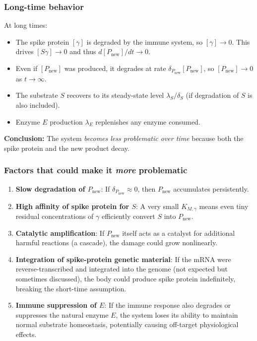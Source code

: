 \documentclass[12pt]{article}
\newcommand{\KMg}{K_{M,\gamma}}
\begin{document}
\subsubsection*{Long-time behavior}

At long times:
\begin{itemize}
  \item The spike protein $[\gamma]$ is degraded by the immune system, so $[\gamma] \to 0$.
        This drives $[S\gamma] \to 0$ and thus $d[P_{\text{new}}]/dt \to 0$.
  \item Even if $[P_{\text{new}}]$ was produced, it degrades at rate $\delta_{P_{\text{new}}}[P_{\text{new}}]$,
        so $[P_{\text{new}}] \to 0$ as $t \to \infty$.
  \item The substrate $S$ recovers to its steady-state level $\lambda_S / \delta_S$ (if
        degradation of $S$ is also included).
  \item Enzyme $E$ production $\lambda_E$ replenishes any enzyme consumed.
\end{itemize}
\textbf{Conclusion:} The system \emph{becomes less problematic over time} because both the spike
protein and the new product decay.

\subsubsection*{Factors that could make it \emph{more} problematic}

\begin{enumerate}[label=\arabic*.]
  \item \textbf{Slow degradation of $P_{\text{new}}$}: If $\delta_{P_{\text{new}}} \approx 0$, then
        $P_{\text{new}}$ accumulates persistently.
  \item \textbf{High affinity of spike protein for $S$}: A very small $\KMg$ means even tiny
        residual concentrations of $\gamma$ efficiently convert $S$ into $P_{\text{new}}$.
  \item \textbf{Catalytic amplification}: If $P_{\text{new}}$ itself acts as a catalyst for
        additional harmful reactions (a cascade), the damage could grow nonlinearly.
  \item \textbf{Integration of spike-protein genetic material}: If the mRNA were reverse-transcribed
        and integrated into the genome (not expected but sometimes discussed), the body
        could produce spike protein indefinitely, breaking the short-time assumption.
  \item \textbf{Immune suppression of $E$}: If the immune response also degrades or suppresses
        the natural enzyme $E$, the system loses its ability to maintain normal substrate
        homeostasis, potentially causing off-target physiological effects.
\end{enumerate}
\end{document}
